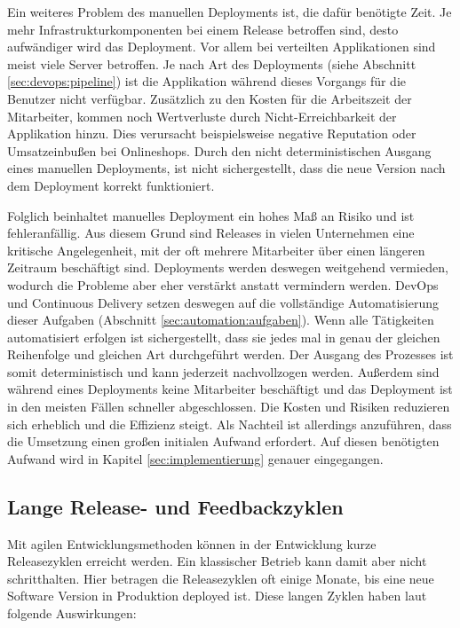 Ein weiteres Problem des manuellen Deployments ist, die dafür benötigte Zeit. Je mehr Infrastrukturkomponenten bei einem Release betroffen sind, desto aufwändiger wird das Deployment. Vor allem bei verteilten Applikationen sind meist viele Server betroffen. Je nach Art des Deployments (siehe Abschnitt \ref{sec:devops:pipeline}) ist die Applikation während dieses Vorgangs für die Benutzer nicht verfügbar. Zusätzlich zu den Kosten für die Arbeitszeit der Mitarbeiter, kommen noch Wertverluste durch Nicht-Erreichbarkeit der Applikation hinzu. Dies verursacht beispielsweise negative Reputation oder Umsatzeinbußen bei Onlineshops. Durch den nicht deterministischen Ausgang eines manuellen Deployments, ist nicht sichergestellt, dass die neue Version nach dem Deployment korrekt funktioniert.

Folglich beinhaltet manuelles Deployment ein hohes Maß an Risiko und ist fehleranfällig. Aus diesem Grund sind Releases in vielen Unternehmen eine kritische Angelegenheit, mit der oft mehrere Mitarbeiter über einen längeren Zeitraum beschäftigt sind. Deployments werden deswegen weitgehend vermieden, wodurch die Probleme aber eher verstärkt anstatt vermindern werden. DevOps und Continuous Delivery setzen deswegen auf die vollständige Automatisierung dieser Aufgaben (Abschnitt \ref{sec:automation:aufgaben}). Wenn alle Tätigkeiten automatisiert erfolgen ist sichergestellt, dass sie jedes mal in genau der gleichen Reihenfolge und gleichen Art durchgeführt werden. Der Ausgang des Prozesses ist somit deterministisch und kann jederzeit nachvollzogen werden. Außerdem sind während eines Deployments keine Mitarbeiter beschäftigt und das Deployment ist in den meisten Fällen schneller abgeschlossen. Die Kosten und Risiken reduzieren sich erheblich und die Effizienz steigt. Als Nachteil ist allerdings anzuführen, dass die Umsetzung einen großen initialen Aufwand erfordert. Auf diesen benötigten Aufwand wird in Kapitel \ref{sec:implementierung} genauer eingegangen.

\subsection{Lange Release- und Feedbackzyklen}
\label{sec:releasezyklen}
Mit agilen Entwicklungsmethoden können in der Entwicklung kurze Releasezyklen erreicht werden. Ein klassischer Betrieb kann damit aber nicht schritthalten. Hier betragen die Releasezyklen oft einige Monate, bis eine neue Software Version in Produktion deployed ist. Diese langen Zyklen haben laut \cite{humble2010} folgende Auswirkungen:

